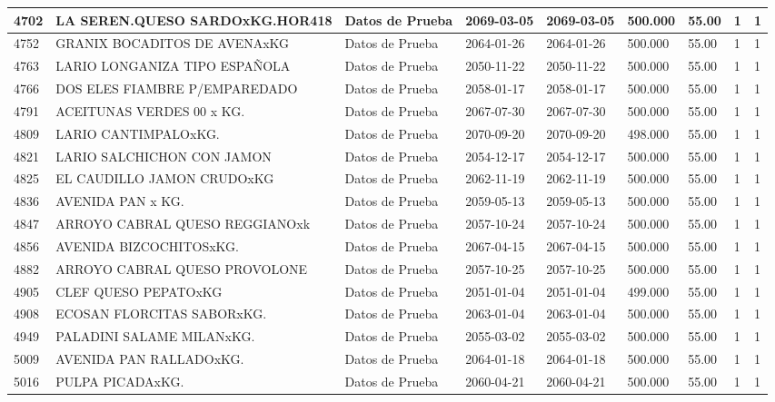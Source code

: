 \documentclass[a4paper,12pt]{article}
\begin{document}
\begin{landscape}
\begin{longtable}{|p{4cm}|p{2.5cm}|p{2.5cm}|p{1.8cm}|p{1.8cm}|p{1cm}|p{1cm}|p{3cm}|p{3cm}||}
4702 & LA SEREN.QUESO SARDOxKG.HOR418 & Datos de Prueba & 2069-03-05 & 2069-03-05 & 500.000 & 55.00 & 1 & 1 \\ \hline 
4752 & GRANIX BOCADITOS DE AVENAxKG & Datos de Prueba & 2064-01-26 & 2064-01-26 & 500.000 & 55.00 & 1 & 1 \\ \hline 
4763 & LARIO LONGANIZA TIPO ESPAÑOLA & Datos de Prueba & 2050-11-22 & 2050-11-22 & 500.000 & 55.00 & 1 & 1 \\ \hline 
4766 & DOS ELES FIAMBRE P/EMPAREDADO & Datos de Prueba & 2058-01-17 & 2058-01-17 & 500.000 & 55.00 & 1 & 1 \\ \hline 
4791 & ACEITUNAS VERDES 00 x KG. & Datos de Prueba & 2067-07-30 & 2067-07-30 & 500.000 & 55.00 & 1 & 1 \\ \hline 
4809 & LARIO CANTIMPALOxKG. & Datos de Prueba & 2070-09-20 & 2070-09-20 & 498.000 & 55.00 & 1 & 1 \\ \hline 
4821 & LARIO SALCHICHON CON JAMON & Datos de Prueba & 2054-12-17 & 2054-12-17 & 500.000 & 55.00 & 1 & 1 \\ \hline 
4825 & EL CAUDILLO JAMON CRUDOxKG & Datos de Prueba & 2062-11-19 & 2062-11-19 & 500.000 & 55.00 & 1 & 1 \\ \hline 
4836 & AVENIDA PAN x KG. & Datos de Prueba & 2059-05-13 & 2059-05-13 & 500.000 & 55.00 & 1 & 1 \\ \hline 
4847 & ARROYO CABRAL QUESO REGGIANOxk & Datos de Prueba & 2057-10-24 & 2057-10-24 & 500.000 & 55.00 & 1 & 1 \\ \hline 
4856 & AVENIDA BIZCOCHITOSxKG. & Datos de Prueba & 2067-04-15 & 2067-04-15 & 500.000 & 55.00 & 1 & 1 \\ \hline 
4882 & ARROYO CABRAL QUESO PROVOLONE & Datos de Prueba & 2057-10-25 & 2057-10-25 & 500.000 & 55.00 & 1 & 1 \\ \hline 
4905 & CLEF QUESO PEPATOxKG & Datos de Prueba & 2051-01-04 & 2051-01-04 & 499.000 & 55.00 & 1 & 1 \\ \hline 
4908 & ECOSAN FLORCITAS SABORxKG. & Datos de Prueba & 2063-01-04 & 2063-01-04 & 500.000 & 55.00 & 1 & 1 \\ \hline 
4949 & PALADINI SALAME MILANxKG. & Datos de Prueba & 2055-03-02 & 2055-03-02 & 500.000 & 55.00 & 1 & 1 \\ \hline 
5009 & AVENIDA PAN RALLADOxKG. & Datos de Prueba & 2064-01-18 & 2064-01-18 & 500.000 & 55.00 & 1 & 1 \\ \hline 
5016 & PULPA PICADAxKG. & Datos de Prueba & 2060-04-21 & 2060-04-21 & 500.000 & 55.00 & 1 & 1 \\ \hline 

\end{longtable}
\end{landscape}
\end{document}
